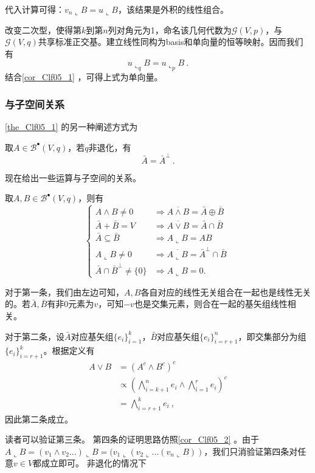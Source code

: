 代入计算可得：$v_n\llcorner B=u\llcorner B$，该结果是外积的线性组合。

改变二次型，使得第$k$到第$n$列对角元为1，命名该几何代数为$\mathcal G(V,p)$，与$\mathcal G(V,q)$共享标准正交基。建立线性同构为basis和单向量的恒等映射。因而我们有
\begin{equation}\label{eq_Clf05_1}
u\llcorner_q B=u\llcorner _p B~.
\end{equation}
结合\autoref{cor_Clf05_1} ，可得上式为单向量。


\subsubsection{与子空间关系}
\autoref{the_Clf05_1} 的另一种阐述方式为
\begin{theorem}{}
取$A\in \mathcal B^{\bullet}(V,q)$，若$q$非退化，有
\begin{equation}
\bar A=\bar A^{\perp}~.
\end{equation}
\end{theorem}
现在给出一些运算与子空间的关系。
\begin{theorem}{}
取$A,B\in \mathcal B^{\bullet}(V,q)$，则有
\begin{equation}
\left\{\begin{aligned}
A \wedge B \neq 0 & \Longrightarrow \overline{A \wedge B}=\bar{A} \oplus \bar{B} \\
\bar{A}+\bar{B}=V & \Longrightarrow \overline{A \vee B}=\bar{A} \cap \bar{B} \\
\bar{A} \subseteq \bar{B} & \Longrightarrow A\llcorner B=A B \\
A\llcorner B \neq 0 & \Longrightarrow \overline{A\llcorner B}=\bar{A}^{\perp} \cap \bar{B} \\
\bar{A} \cap \bar{B}^{\perp} \neq\{0\} & \Longrightarrow A\llcorner B=0 .
\end{aligned}\right.~
\end{equation}
\end{theorem}
对于第一条，我们由左边可知，$A,B$各自对应的线性无关组合在一起也是线性无关的。若$\bar A,\bar B$有非0元素为$v$，可知$-v$也是交集元素，则合在一起的基矢组线性相关。

对于第二条，设$\bar A$对应基矢组$\{e_i\}^k_{i=1}$，$\bar B$对应基矢组$\{e_i\}^n_{i=r+1}$，即交集部分为组$\{e_i\}^k_{i=r+1}$。根据定义有
\begin{equation}
\begin{aligned}
A \vee B &=(A^c\wedge B^c)^c\\
&\propto\left(\bigwedge\limits^n_{i=k+1}e_i\wedge \bigwedge\limits^r_{i=1}e_i\right)^c\\
&=\bigwedge\limits^k_{i=r+1}e_i~,
\end{aligned}
\end{equation}
因此第二条成立。

读者可以验证第三条。
第四条的证明思路仿照\autoref{cor_Clf05_2} 。由于$A\llcorner B=(v_1\wedge v_2...)\llcorner B=(v_1\llcorner (v_2\llcorner...(v_n\llcorner B))$，我们只消验证第四条对任意$v\in V$都成立即可。
非退化的情况下
